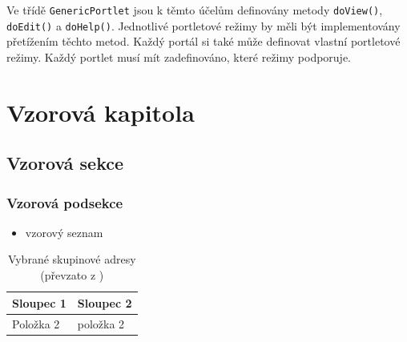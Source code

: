 \documentclass{fithesis}
\begin{document}
Ve třídě \verb|GenericPortlet| jsou k těmto účelům definovány metody \verb|doView()|, \verb|doEdit()| a \verb|doHelp()|. Jednotlivé portletové režimy by měli být implementovány přetížením těchto metod. Každý portál si také může definovat vlastní portletové režimy. Každý portlet musí mít zadefinováno, které režimy podporuje.

\chapter{Vzorová kapitola}
\section{Vzorová sekce}
\subsection{Vzorová podsekce}



\begin{itemize}
\item vzorový seznam
\end{itemize}


\begin{table}
\centering
\begin{tabular}{|p{3cm}|p{8cm}|}
\hline Sloupec 1 & Sloupec 2 \\
\hline Položka 2 & položka 2 \\
\hline
\end{tabular}
\caption{Vybrané skupinové adresy (převzato z \cite{satrapa-ipv6})}
\end{table}



\end{document}
